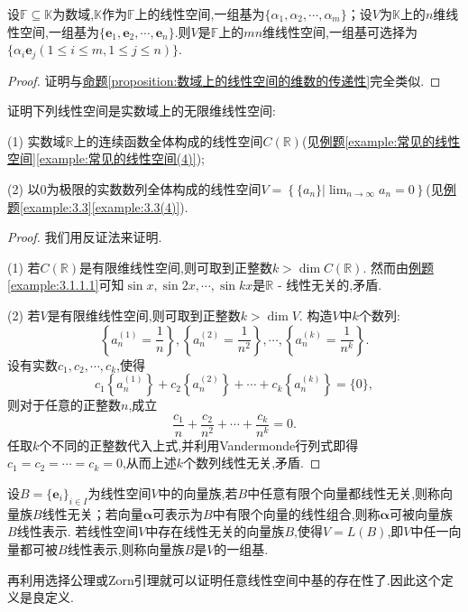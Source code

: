 \documentclass[lang=cn,newtx,10pt,scheme=chinese]{elegantbook}
\begin{document}
\begin{proposition}\label{proposition:数域上的线性空间的基的传递性}
    设\(\mathbb{F}\subseteq\mathbb{K}\)为数域,\(\mathbb{K}\)作为\(\mathbb{F}\)上的线性空间,一组基为\(\{\alpha_1,\alpha_2,\cdots,\alpha_m\}\)；设\(V\)为\(\mathbb{K}\)上的\(n\)维线性空间,一组基为\(\{\boldsymbol{e}_1,\boldsymbol{e}_2,\cdots,\boldsymbol{e}_n\}\).则\(V\)是\(\mathbb{F}\)上的\(mn\)维线性空间,一组基可选择为\(\{\alpha_i\boldsymbol{e}_j(1\leq i\leq m,1\leq j\leq n)\}\).
\end{proposition}
\begin{proof}
    证明与\hyperref[proposition:数域上的线性空间的维数的传递性]{命题\ref{proposition:数域上的线性空间的维数的传递性}}完全类似.
\end{proof}

\begin{example}
证明下列线性空间是实数域上的无限维线性空间:

(1) 实数域\(\mathbb{R}\)上的连续函数全体构成的线性空间\(C(\mathbb{R})\)(见\hyperref[example:常见的线性空间(4)]{例题\ref{example:常见的线性空间}\ref{example:常见的线性空间(4)}});

(2) 以\(0\)为极限的实数数列全体构成的线性空间\(V = \left\{\{a_n\}|\lim_{n\rightarrow\infty}a_n = 0\right\}\)(见\hyperref[example:3.3(4)]{例题\ref{example:3.3}\ref{example:3.3(4)}}).
\end{example}
\begin{proof}
    我们用反证法来证明.

(1) 若\(C(\mathbb{R})\)是有限维线性空间,则可取到正整数\(k>\dim C(\mathbb{R})\). 然而由\hyperref[example:3.1.1.1]{例题\ref{example:3.1.1.1}}可知\(\sin x,\sin 2x,\cdots,\sin kx\)是\(\mathbb{R}\) - 线性无关的,矛盾.

(2) 若\(V\)是有限维线性空间,则可取到正整数\(k>\dim V\). 构造\(V\)中\(k\)个数列:
\[
\left\{a_n^{(1)}=\frac{1}{n}\right\},\left\{a_n^{(2)}=\frac{1}{n^2}\right\},\cdots,\left\{a_n^{(k)}=\frac{1}{n^k}\right\}.
\]
设有实数\(c_1,c_2,\cdots,c_k\),使得
\[
c_1\left\{a_n^{(1)}\right\}+c_2\left\{a_n^{(2)}\right\}+\cdots + c_k\left\{a_n^{(k)}\right\}=\{0\},
\]
则对于任意的正整数\(n\),成立
\[
\frac{c_1}{n}+\frac{c_2}{n^2}+\cdots+\frac{c_k}{n^k}=0.
\]
任取\(k\)个不同的正整数代入上式,并利用Vandermonde行列式即得\(c_1 = c_2=\cdots = c_k = 0\),从而上述\(k\)个数列线性无关,矛盾. 
\end{proof}

\begin{definition}[无限维空间基的定义]\label{definition:无限维空间基的定义}
设\(B = \{ \boldsymbol{e}_i\}_{i\in I}\)为线性空间\(V\)中的向量族,若\(B\)中任意有限个向量都线性无关,则称向量族\(B\)线性无关；若向量\(\boldsymbol{\alpha}\)可表示为\(B\)中有限个向量的线性组合,则称\(\boldsymbol{\alpha}\)可被向量族\(B\)线性表示. 若线性空间\(V\)中存在线性无关的向量族\(B\),使得\(V = L(B)\),即\(V\)中任一向量都可被\(B\)线性表示,则称向量族\(B\)是\(V\)的一组基.
\end{definition}
\begin{note}
再利用选择公理或Zorn引理就可以证明任意线性空间中基的存在性了.因此这个定义是良定义.
\end{note}
\end{document}
